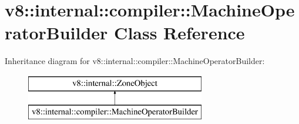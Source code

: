 \hypertarget{classv8_1_1internal_1_1compiler_1_1_machine_operator_builder}{}\section{v8\+:\+:internal\+:\+:compiler\+:\+:Machine\+Operator\+Builder Class Reference}
\label{classv8_1_1internal_1_1compiler_1_1_machine_operator_builder}
Inheritance diagram for v8\+:\+:internal\+:\+:compiler\+:\+:Machine\+Operator\+Builder\+:\begin{figure}[H]
\begin{center}
\leavevmode
\includegraphics[height=2.000000cm]{classv8_1_1internal_1_1compiler_1_1_machine_operator_builder}
\end{center}
\end{figure}
